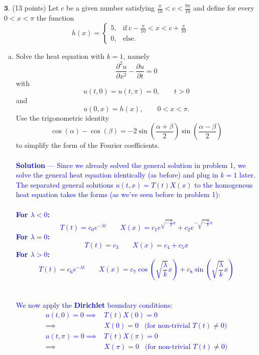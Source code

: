 \documentclass[12pt]{article}
\begin{document}
\noindent $\textbf{3}$. (13 points) Let $c$ be a given number satisfying $\frac{\pi}{10} < c < \frac{9\pi}{10}$ and define
for every $0 < x < \pi$ the function 
$$h(x) =
\begin{cases}
	5, & \mathrm{if} \ c - \frac{\pi}{10} < x < c + \frac{\pi}{10} \\ 
	0, & \mathrm{else}.
\end{cases}$$
%
\begin{enumerate}[(a)]
\item Solve the heat equation with $k=1$, namely
$$\frac{\partial^2 u}{\partial x^2} - \frac{\partial u}{\partial t}= 0$$
with
$$u(t,0) = u(t,\pi) =0 , \qquad t > 0$$
and
$$ u(0,x) = h(x), \qquad 0 < x < \pi.$$
Use the trigonometric identity
$$ \cos(\alpha) - \cos(\beta) = -2\sin \left ( \frac{\alpha + \beta}{2} \right )\sin \left ( \frac{\alpha - \beta}{2} \right )$$
to simplify the form of the Fourier coefficients. \\ \\
\textcolor{blue}{\textbf{Solution} — Since we already solved the general solution in problem 1, we solve the general heat equation identically (as before) and plug in $k=1$ later. The separated general solutions $u(t,x) = T(t)X(x)$ to the homogenous heat equation takes the forms (as we've seen before in problem 1): \\  \\
\textbf{For $\lambda < 0$:} \\
$$T(t) = c_0 e^{-\lambda t} \;\;\;\;\;\;\; X(x) = c_1 e^{\sqrt{-\frac{\lambda}{k}} x} + c_2 e^{-\sqrt{-\frac{\lambda}{k}} x}$$
\textbf{For $\lambda = 0$:} \\
$$T(t) = c_3 \;\;\;\;\;\;\;  X(x) = c_4 + c_5x$$
\textbf{For $\lambda > 0$:} \\ 
$$T(t) = c_6 e^{-\lambda t} \;\;\;\;\;\;\; X(x) = c_7 \cos \left( \sqrt{\frac{\lambda}{k}} x \right) + c_8 \sin \left( \sqrt{\frac{\lambda}{k}} x \right)$$ \\ \\
We now apply the \textbf{Dirichlet} boundary conditions: \\
\begin{align*}
u(t,0) = 0 \implies& T(t)X(0) = 0 \\
\implies& X(0) = 0 \;\;\; \text{(for non-trivial $T(t) \neq 0$)} \\
u(t,\pi) = 0 \implies& T(t)X(\pi) = 0 \\
\implies& X(\pi) = 0 \;\;\; \text{(for non-trivial $T(t) \neq 0$)} \\
\end{align*}
}
\end{enumerate}
\end{document}
